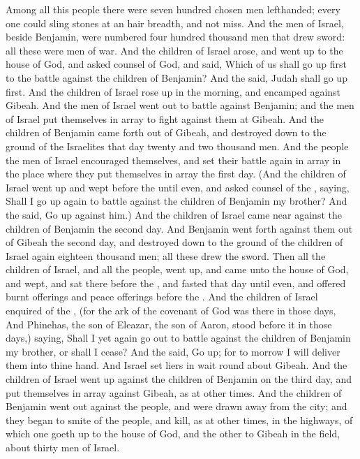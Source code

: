 \begin{biblechapter}
\verse Among all this people there were seven hundred chosen men lefthanded; every one could sling stones at an hair breadth, and not miss.
\verse And the men of Israel, beside Benjamin, were numbered four hundred thousand men that drew sword: all these were men of war.
\verse And the children of Israel arose, and went up to the house of God, and asked counsel of God, and said, Which of us shall go up first to the battle against the children of Benjamin? And the \LORD said, Judah shall go up first.
\verse And the children of Israel rose up in the morning, and encamped against Gibeah.
\verse And the men of Israel went out to battle against Benjamin; and the men of Israel put themselves in array to fight against them at Gibeah.
\verse And the children of Benjamin came forth out of Gibeah, and destroyed down to the ground of the Israelites that day twenty and two thousand men.
\verse And the people the men of Israel encouraged themselves, and set their battle again in array in the place where they put themselves in array the first day.
\verse (And the children of Israel went up and wept before the \LORD until even, and asked counsel of the \LORD, saying, Shall I go up again to battle against the children of Benjamin my brother? And the \LORD said, Go up against him.)
\verse And the children of Israel came near against the children of Benjamin the second day.
\verse And Benjamin went forth against them out of Gibeah the second day, and destroyed down to the ground of the children of Israel again eighteen thousand men; all these drew the sword.
\verse Then all the children of Israel, and all the people, went up, and came unto the house of God, and wept, and sat there before the \LORD, and fasted that day until even, and offered burnt offerings and peace offerings before the \LORD.
\verse And the children of Israel enquired of the \LORD, (for the ark of the covenant of God was there in those days,
\verse And Phinehas, the son of Eleazar, the son of Aaron, stood before it in those days,) saying, Shall I yet again go out to battle against the children of Benjamin my brother, or shall I cease? And the \LORD said, Go up; for to morrow I will deliver them into thine hand.
\verse And Israel set liers in wait round about Gibeah.
\verse And the children of Israel went up against the children of Benjamin on the third day, and put themselves in array against Gibeah, as at other times.
\verse And the children of Benjamin went out against the people, and were drawn away from the city; and they began to smite of the people, and kill, as at other times, in the highways, of which one goeth up to the house of God, and the other to Gibeah in the field, about thirty men of Israel.

\end{biblechapter}
